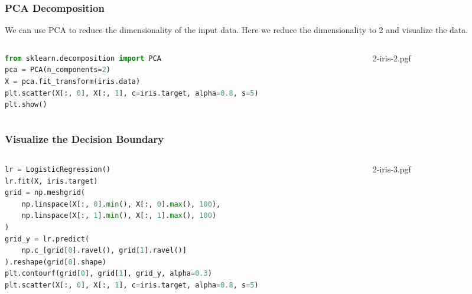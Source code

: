 \documentclass[beamer, en, version=2.0]{huangfusl-template}
\begin{document}
    \begin{frame}[fragile]
        \frametitle{PCA Decomposition}

        We can use PCA to reduce the dimensionality of the input data. Here we reduce the dimensionality to 2 and visualize the data.

        \begin{columns}
            \begin{column}{0.5\textwidth}
\begin{lstlisting}[language=python, breaklines]
from sklearn.decomposition import PCA
pca = PCA(n_components=2)
X = pca.fit_transform(iris.data)
plt.scatter(X[:, 0], X[:, 1], c=iris.target, alpha=0.8, s=5)
plt.show()
\end{lstlisting}
            \end{column}
            \begin{column}{0.5\textwidth}
                \begin{figure}
                    {2-iris-2.pgf}
                \end{figure}
            \end{column}
        \end{columns}
    \end{frame}

    \begin{frame}[fragile]
        \frametitle{Visualize the Decision Boundary}

        \begin{columns}
            \begin{column}{0.5\textwidth}
\begin{lstlisting}[language=python, breaklines]
lr = LogisticRegression()
lr.fit(X, iris.target)
grid = np.meshgrid(
    np.linspace(X[:, 0].min(), X[:, 0].max(), 100),
    np.linspace(X[:, 1].min(), X[:, 1].max(), 100)
)
grid_y = lr.predict(
    np.c_[grid[0].ravel(), grid[1].ravel()]
).reshape(grid[0].shape)
plt.contourf(grid[0], grid[1], grid_y, alpha=0.3)
plt.scatter(X[:, 0], X[:, 1], c=iris.target, alpha=0.8, s=5)
\end{lstlisting}
            \end{column}
            \begin{column}{0.5\textwidth}
                \begin{figure}
                    {2-iris-3.pgf}
                \end{figure}
            \end{column}
        \end{columns}
    \end{frame}
\end{document}
